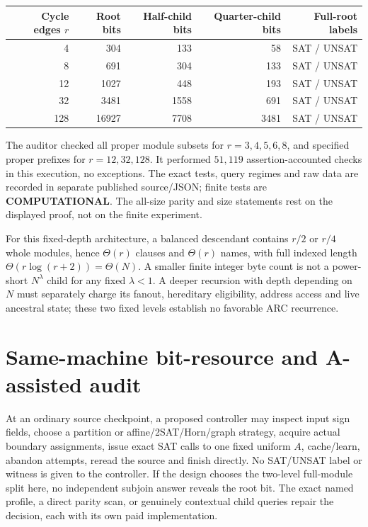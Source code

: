 \documentclass[11pt]{article}
\begin{document}
\begin{center}
\begin{tabular}{rrrrr}
\toprule
Cycle edges \(r\)&Root bits&Half-child bits&Quarter-child bits&Full-root labels\\
\midrule
4&304&133&58&SAT / UNSAT\\
8&691&304&133&SAT / UNSAT\\
12&1027&448&193&SAT / UNSAT\\
32&3481&1558&691&SAT / UNSAT\\
128&16927&7708&3481&SAT / UNSAT\\
\bottomrule
\end{tabular}
\end{center}
The auditor checked all proper module subsets for \(r=3,4,5,6,8\), and specified proper prefixes for \(r=12,32,128\). It performed \(51{,}119\) assertion-accounted checks in this execution, no exceptions. The exact tests, query regimes and raw data are recorded in separate published source/JSON; finite tests are \textbf{COMPUTATIONAL}. The all-size parity and size statements rest on the displayed proof, not on the finite experiment.

For this fixed-depth architecture, a balanced descendant contains \(r/2\) or \(r/4\) whole modules, hence \(\Theta(r)\) clauses and \(\Theta(r)\) names, with full indexed length \(\Theta(r\log(r+2))=\Theta(N)\). A smaller finite integer byte count is not a power-short \(N^\lambda\) child for any fixed \(\lambda<1\). A deeper recursion with depth depending on \(N\) must separately charge its fanout, hereditary eligibility, address access and live ancestral state; these two fixed levels establish no favorable ARC recurrence.

\section{Same-machine bit-resource and A-assisted audit}
At an ordinary source checkpoint, a proposed controller may inspect input sign fields, choose a partition or affine/2SAT/Horn/graph strategy, acquire actual boundary assignments, issue exact SAT calls to one fixed uniform \(A\), cache/learn, abandon attempts, reread the source and finish directly. No SAT/UNSAT label or witness is given to the controller. If the design chooses the two-level full-module split here, no independent subjoin answer reveals the root bit. The exact named profile, a direct parity scan, or genuinely contextual child queries repair the decision, each with its own paid implementation.
\end{document}
